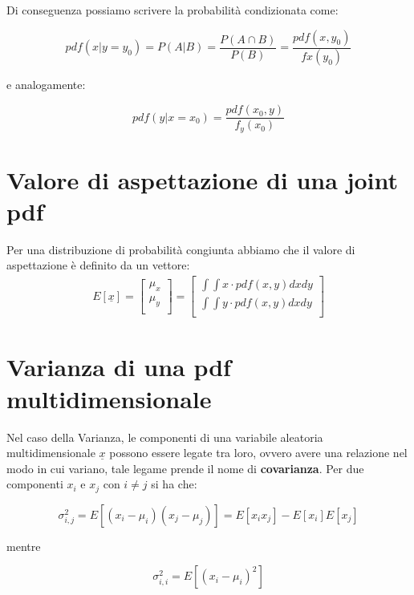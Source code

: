 \documentclass[11pt,a4paper]{book}
\begin{document}
Di conseguenza possiamo scrivere la probabilit\`{a} condizionata come:

\begin{equation}
	pdf(x \vert y = y_0) = P(A\vert B) = \dfrac{P(A \cap B)}{P(B)} = \dfrac{pdf(x,y_0)}{fx(y_0)}
\end{equation}

e analogamente:

\begin{equation}
	pdf(y \vert x = x_0) = \dfrac{pdf(x_0,y)}{f_y(x_0)}
\end{equation}

\section{Valore di aspettazione di una joint pdf}

Per una distribuzione di probabilit\`{a} congiunta abbiamo che il valore di aspettazione \`{e} definito da un vettore:
\begin{align}
E[\underline{x}] =
	\begin{bmatrix}
		\mu_x \\
		\mu_y \\
	\end{bmatrix}
	= 
	\begin{bmatrix}
		\int \int x \cdot pdf(x,y)dxdy \\
		\int \int y \cdot pdf(x,y)dxdy \\
	\end{bmatrix}	
\end{align}



\section{Varianza di una pdf multidimensionale}

Nel caso della Varianza, le componenti di una variabile aleatoria multidimensionale $\underline{x}$ possono essere legate tra loro, ovvero avere una relazione nel modo in cui variano, tale legame prende il nome di \textbf{covarianza}. Per due componenti $x_i$ e $x_j$ con $i \neq j$ si ha che: 

\begin{equation}
	\sigma_{i,j}^2 = E[(x_i - \mu_i)(x_j - \mu_j)] = E[x_ix_j] - E[x_i]E[x_j]
\end{equation}  	

\noindent mentre   	

\begin{equation}
	\sigma_{i,i}^2 = E[(x_i-\mu_i)^2]
\end{equation}
 
\end{document}
